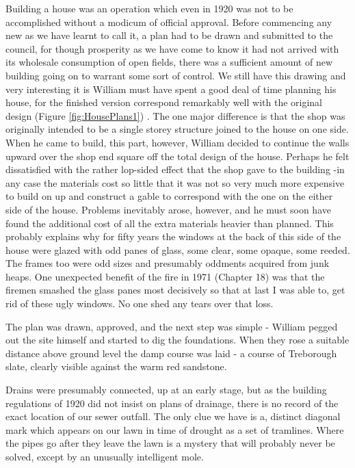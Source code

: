 Building a house was an operation which even in 1920 was not to be accomplished without a modicum of official approval. Before commencing any new  as we have learnt to call it, a plan had to be drawn and submitted to the council, for though prosperity as we have come to know it had not arrived with its wholesale consumption of open fields, there was a sufficient amount of new building going on to warrant some sort of control. We still have this drawing and very interesting it is William must have spent a good deal of time planning his house, for the finished version correspond remarkably well with the original design (Figure \ref{fig:HousePlans1}) . The one major difference is that the shop was originally intended to be a single storey structure joined to the house on one side. When he came to build, this part, however, William decided to continue the walls upward over the shop end square off the total design of the house. Perhaps he felt dissatisfied with the rather lop-sided effect that the shop gave to the building -in any case the materials cost so little that it was not so very much more expensive to build on up and construct a gable to correspond with the one on the either side of the house. Problems inevitably arose, however, and he must soon have found the additional cost of all the extra materials heavier than planned. This probably explains why for fifty years the windows at the back of this side of the house were glazed with odd panes of glass, some clear, some opaque, some reeded. The frames too were odd sizes and presumably oddments acquired from junk heaps. One unexpected benefit of the fire in 1971 (Chapter 18) was that the firemen smashed the glass panes most decisively so that at last I was able to, get rid of these ugly windows. No one shed any tears over that loss.

The plan was drawn, approved, and the next step was simple - William pegged out the site himself and started to dig the foundations. When they rose a suitable distance above ground level the damp course was laid - a course of Treborough slate, clearly visible against the warm red sandstone.

Drains were presumably connected, up at an early stage, but as the building regulations of 1920 did not insist on plans of drainage, there is no record of the exact location of our sewer outfall. The only clue we have is a, distinct diagonal mark which appears on our lawn in time of drought as a set of tramlines. Where the pipes go after they leave the lawn is a mystery that will probably never be solved, except by an unusually intelligent mole.

